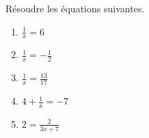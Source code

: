 
\begin{exercice}\label{exosmath-0274}

    Résoudre les équations suivantes.
    \begin{multicols}{2}
        \begin{enumerate}
            \item
                \( \frac{1}{ x }=6\)
            \item
                \( \frac{1}{ x }=-\frac{ 1 }{2}\)
            \item
                \( \frac{1}{ x }=\frac{ 13 }{ 17 }\)
            \item
                \( 4+\frac{1}{ x }=-7\)
            \item
                \( 2=\frac{ 2 }{ 3x+7 }\)
        \end{enumerate}
    \end{multicols}

\end{exercice}
